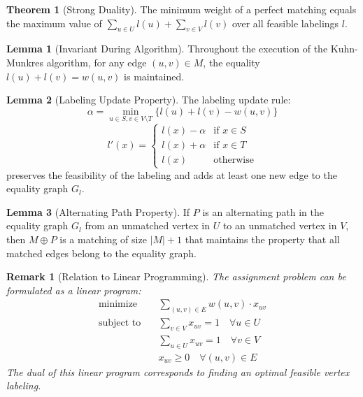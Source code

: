\documentclass{article}
\newtheorem{remark}{Remark}
\theoremstyle{definition}
\newtheorem{theorem}{Theorem}
\newtheorem{lemma}{Lemma}
\begin{document}
\begin{theorem}[Strong Duality]
The minimum weight of a perfect matching equals the maximum value of $\sum_{u \in U} l(u) + \sum_{v \in V} l(v)$ over all feasible labelings $l$.
\end{theorem}
\begin{lemma}[Invariant During Algorithm]
Throughout the execution of the Kuhn-Munkres algorithm, for any edge $(u,v) \in M$, the equality $l(u) + l(v) = w(u,v)$ is maintained.
\end{lemma}
\begin{lemma}[Labeling Update Property]
The labeling update rule:
\begin{equation}
\alpha = \min_{u \in S, v \in V \setminus T} \{l(u) + l(v) - w(u,v)\}
\end{equation}
\begin{equation}
l'(x) = \begin{cases}
l(x) - \alpha & \text{if } x \in S\\
l(x) + \alpha & \text{if } x \in T\\
l(x) & \text{otherwise}
\end{cases}
\end{equation}
preserves the feasibility of the labeling and adds at least one new edge to the equality graph $G_l$.
\end{lemma}

\begin{lemma}[Alternating Path Property]
If $P$ is an alternating path in the equality graph $G_l$ from an unmatched vertex in $U$ to an unmatched vertex in $V$, then $M \oplus P$ is a matching of size $|M|+1$ that maintains the property that all matched edges belong to the equality graph.
\end{lemma}

\begin{remark}[Relation to Linear Programming]
The assignment problem can be formulated as a linear program:
\begin{align}
\text{minimize} \quad & \sum_{(u,v) \in E} w(u,v) \cdot x_{uv}\\
\text{subject to} \quad & \sum_{v \in V} x_{uv} = 1 \quad \forall u \in U\\
& \sum_{u \in U} x_{uv} = 1 \quad \forall v \in V\\
& x_{uv} \geq 0 \quad \forall (u,v) \in E
\end{align}
The dual of this linear program corresponds to finding an optimal feasible vertex labeling.
\end{remark}
\end{document}
